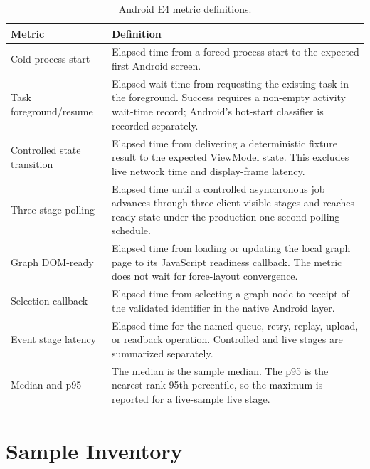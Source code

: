 \begin{longtable}{P{3.7cm}P{10.4cm}}
\caption{Android E4 metric definitions.}
\label{tab:e4-metric-definitions}\\
\toprule
Metric & Definition \\
\midrule
Cold process start &
Elapsed time from a forced process start to the expected first Android screen. \\
\addlinespace
Task foreground/resume &
Elapsed wait time from requesting the existing task in the foreground.
Success requires a non-empty activity wait-time record; Android's hot-start classifier is recorded separately. \\
\addlinespace
Controlled state transition &
Elapsed time from delivering a deterministic fixture result to the expected ViewModel state.
This excludes live network time and display-frame latency. \\
\addlinespace
Three-stage polling &
Elapsed time until a controlled asynchronous job advances through three client-visible stages and reaches ready state under the production one-second polling schedule. \\
\addlinespace
Graph DOM-ready &
Elapsed time from loading or updating the local graph page to its JavaScript readiness callback.
The metric does not wait for force-layout convergence. \\
\addlinespace
Selection callback &
Elapsed time from selecting a graph node to receipt of the validated identifier in the native Android layer. \\
\addlinespace
Event stage latency &
Elapsed time for the named queue, retry, replay, upload, or readback operation.
Controlled and live stages are summarized separately. \\
\addlinespace
Median and p95 &
The median is the sample median.
The p95 is the nearest-rank 95th percentile, so the maximum is reported for a five-sample live stage. \\
\bottomrule
\end{longtable}

\section{Sample Inventory}

